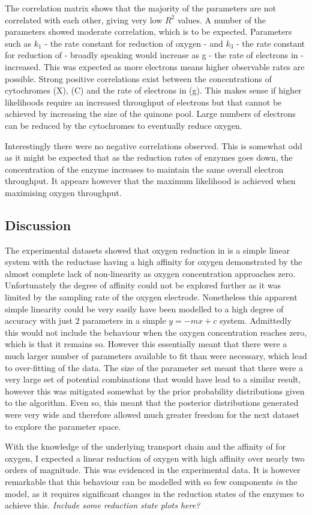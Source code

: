 The correlation matrix shows that the majority of the parameters are not correlated with each other, giving very low $R^2$ values. A number of the parameters showed moderate correlation, which is to be expected. Parameters such as $k_1$ - the rate constant for reduction of oxygen - and $k_3$ - the rate constant for reduction of \cbbthree{} -  broadly speaking would increase as g - the rate of electrons in -  increased. This was expected as more electrons means higher observable rates are possible. Strong positive correlations exist between the concentrations of cytochromes (X), \cbbthree{}(C) and the rate of electrons in (g). This makes sense if higher likelihoods require an increased throughput of electrons but that cannot be achieved by increasing the size of the quinone pool. Large numbers of electrons can be reduced by the cytochromes to eventually reduce oxygen.

Interestingly there were no negative correlations observed. This is somewhat odd as it might be expected that as the reduction rates of enzymes goes down, the concentration of the enzyme increases to maintain the same overall electron throughput. It appears however that the maximum likelihood is achieved when maximising oxygen throughput.
\subsection{Discussion}
The experimental datasets showed that oxygen reduction in \Nm{} is a simple linear system with the reductase having a high affinity for oxygen demonstrated by the almost complete lack of non-linearity as oxygen concentration approaches zero. Unfortunately the degree of affinity could not be explored further as it was limited by the sampling rate of the oxygen electrode. Nonetheless this apparent simple linearity could be very easily have been modelled to a high degree of accuracy with just 2 parameters in a simple $y=-mx+c$ system. Admittedly this would not include the behaviour when the oxygen concentration reaches zero, which is that it remains so. However this essentially meant that there were a much larger number of parameters available to fit than were necessary, which lead to over-fitting of the data. The size of the parameter set meant that there were a very large set of potential combinations that would have lead to a similar result, however this was mitigated somewhat by the prior probability distributions given to the algorithm. Even so, this meant that the posterior distributions generated were very wide and therefore allowed much greater freedom for the next dataset to explore the parameter space.

With the knowledge of the underlying transport chain and the affinity of \cbbthree{} for oxygen, I expected a linear reduction of oxygen with high affinity over nearly two orders of magnitude. This was evidenced in the experimental data. It is however remarkable that this behaviour can be modelled with so few components \textit{in} the model, as it requires significant changes in the reduction states of the enzymes to achieve this. \textit{Include some reduction state plots here?}
